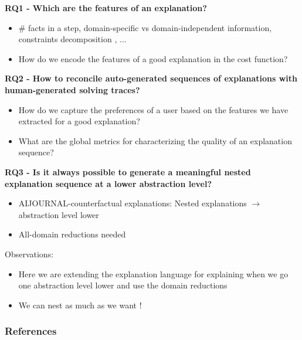 \documentclass{beamer}
\begin{document}
				\begin{frame}
				\textbf{RQ1 - Which are the features of an explanation?}
				\begin{itemize}
					\item \# facts in a step, domain-specific vs domain-independent information, constraints decomposition , ...
					\item How do we encode the features of a good explanation in the cost function?
				\end{itemize}
				\textbf{RQ2 - How to reconcile auto-generated sequences of explanations with human-generated solving traces?} 
				\begin{itemize}
					\item How do we capture the preferences of a user based on the features we have extracted for a good explanation?
					\item What are the global metrics  for characterizing the quality of an explanation sequence?
				\end{itemize}

				\end{frame}

			\begin{frame}
				\textbf{RQ3 - Is it always possible to generate a meaningful nested explanation sequence at a lower abstraction level?}
				\begin{itemize}
					\item AIJOURNAL-counterfactual explanations: Nested explanations $\rightarrow$ abstraction level lower
					\item All-domain reductions needed 
				\end{itemize}
			Observations:
			\begin{itemize}
				\item {\color{red} Here we are extending the explanation language for explaining when we go one abstraction level lower and use the domain reductions}
				\item {\color{red} We can nest as much as we want !}
			\end{itemize}
				\end{frame}
			
		\begin{frame}[allowframebreaks]
			\frametitle{References}
			
			
		\end{frame}
		
		
		
		
		
	
\end{document}
